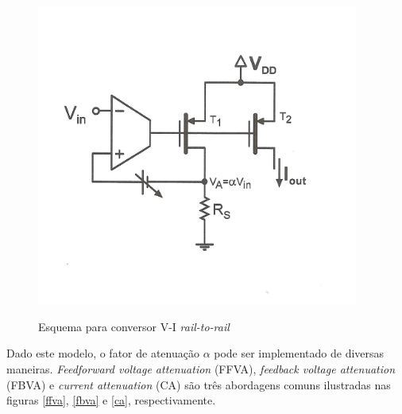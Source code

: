 \documentclass[
	12pt,				%
	oneside,			%
	a4paper,			%
	english,			%
	french,				%
	spanish,			%
	brazil				%
	]{abntex2}
\begin{document}
\begin{figure}[!ht]
  \centering
  \includegraphics[width=300pt]{conversorvi.png}\\
  \caption{Esquema para conversor V-I \textit{rail-to-rail}}\label{conversorvi}
\end{figure}

Dado este modelo, o fator de atenuação $\alpha$ pode ser implementado de diversas maneiras. \textit{Feedforward   voltage   attenuation} (FFVA), \textit{feedback voltage attenuation} (FBVA) e \textit{current attenuation} (CA) são três abordagens comuns \cite{azcona-calvo} ilustradas nas figuras \ref{ffva}, \ref{fbva} e \ref{ca}, respectivamente.
\end{document}
